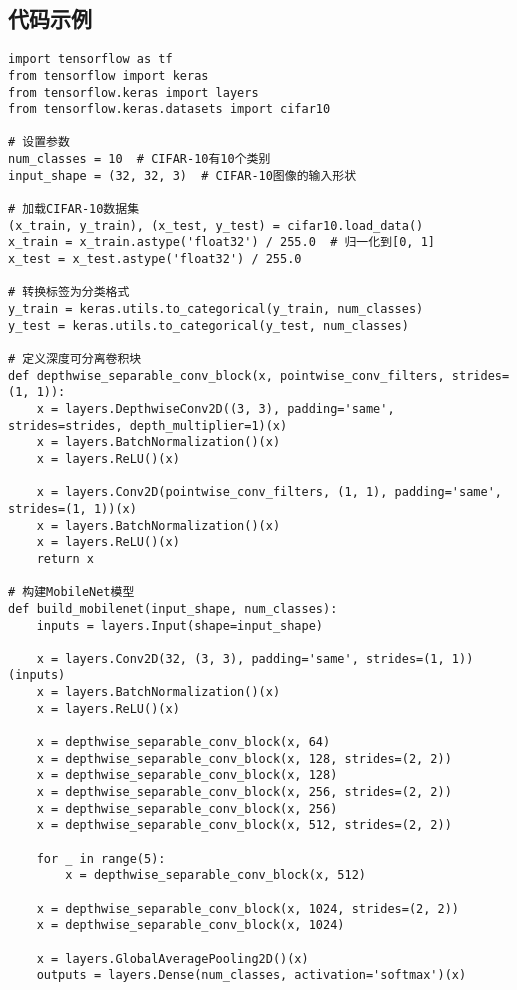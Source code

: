 \subsection*{代码示例}
\begin{lstlisting}
import tensorflow as tf
from tensorflow import keras
from tensorflow.keras import layers
from tensorflow.keras.datasets import cifar10

# 设置参数
num_classes = 10  # CIFAR-10有10个类别
input_shape = (32, 32, 3)  # CIFAR-10图像的输入形状

# 加载CIFAR-10数据集
(x_train, y_train), (x_test, y_test) = cifar10.load_data()
x_train = x_train.astype('float32') / 255.0  # 归一化到[0, 1]
x_test = x_test.astype('float32') / 255.0

# 转换标签为分类格式
y_train = keras.utils.to_categorical(y_train, num_classes)
y_test = keras.utils.to_categorical(y_test, num_classes)

# 定义深度可分离卷积块
def depthwise_separable_conv_block(x, pointwise_conv_filters, strides=(1, 1)):
    x = layers.DepthwiseConv2D((3, 3), padding='same', strides=strides, depth_multiplier=1)(x)
    x = layers.BatchNormalization()(x)
    x = layers.ReLU()(x)

    x = layers.Conv2D(pointwise_conv_filters, (1, 1), padding='same', strides=(1, 1))(x)
    x = layers.BatchNormalization()(x)
    x = layers.ReLU()(x)
    return x

# 构建MobileNet模型
def build_mobilenet(input_shape, num_classes):
    inputs = layers.Input(shape=input_shape)
    
    x = layers.Conv2D(32, (3, 3), padding='same', strides=(1, 1))(inputs)
    x = layers.BatchNormalization()(x)
    x = layers.ReLU()(x)
    
    x = depthwise_separable_conv_block(x, 64)
    x = depthwise_separable_conv_block(x, 128, strides=(2, 2))
    x = depthwise_separable_conv_block(x, 128)
    x = depthwise_separable_conv_block(x, 256, strides=(2, 2))
    x = depthwise_separable_conv_block(x, 256)
    x = depthwise_separable_conv_block(x, 512, strides=(2, 2))
    
    for _ in range(5):
        x = depthwise_separable_conv_block(x, 512)
    
    x = depthwise_separable_conv_block(x, 1024, strides=(2, 2))
    x = depthwise_separable_conv_block(x, 1024)
    
    x = layers.GlobalAveragePooling2D()(x)
    outputs = layers.Dense(num_classes, activation='softmax')(x)
    

\end{lstlisting}
